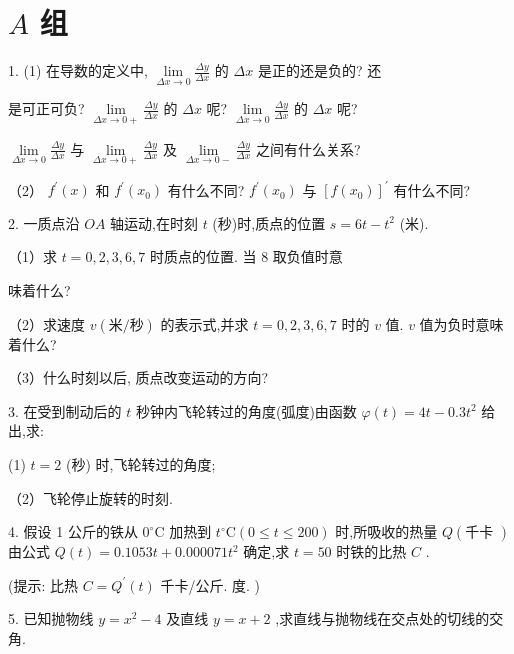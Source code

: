 \documentclass[lang=cn,newtx,12pt,scheme=chinese]{elegantbook}
\begin{document}
\section*{\(A\) 组}

1. (1) 在导数的定义中, \(\mathop{\lim }\limits_{{{\Delta x} \rightarrow 0}}\frac{\Delta y}{\Delta x}\) 的 \({\Delta x}\) 是正的还是负的? 还

是可正可负? \(\mathop{\lim }\limits_{{{\Delta x} \rightarrow 0 + }}\frac{\Delta y}{\Delta x}\) 的 \({\Delta x}\) 呢? \(\mathop{\lim }\limits_{{{\Delta x} \rightarrow 0}}\frac{\Delta y}{\Delta x}\) 的 \({\Delta x}\) 呢?

\(\mathop{\lim }\limits_{{{\Delta x} \rightarrow 0}}\frac{\Delta y}{\Delta x}\) 与 \(\mathop{\lim }\limits_{{{\Delta x} \rightarrow 0 + }}\frac{\Delta y}{\Delta x}\) 及 \(\mathop{\lim }\limits_{{{\Delta x} \rightarrow 0 - }}\frac{\Delta y}{\Delta x}\) 之间有什么关系?

（2） \({f}^{\prime }\left( x\right)\) 和 \({f}^{\prime }\left( {x}_{0}\right)\) 有什么不同? \({f}^{\prime }\left( {x}_{0}\right)\) 与 \({\left\lbrack f\left( {x}_{0}\right) \right\rbrack }^{\prime }\) 有什么不同?

2. 一质点沿 \({OA}\) 轴运动,在时刻 \(t\) (秒)时,质点的位置 \(s = {6t} - {t}^{2}\) (米).

（1）求 \(t = 0,2,3,6,7\) 时质点的位置. 当 8 取负值时意

味着什么?

（2）求速度 \(v\left( {\text{米}/\text{秒}}\right)\) 的表示式,并求 \(t = 0,2,3,6,7\) 时的 \(v\) 值. \(v\) 值为负时意味着什么?

（3）什么时刻以后, 质点改变运动的方向?

3. 在受到制动后的 \(t\) 秒钟内飞轮转过的角度(弧度)由函数 \(\varphi \left( t\right) = {4t} - {0.3}{t}^{2}\) 给出,求:

(1) \(t = 2\) (秒) 时,飞轮转过的角度;

（2）飞轮停止旋转的时刻.

4. 假设 1 公斤的铁从 \({0}^{ \circ }\mathrm{C}\) 加热到 \({t}^{ \circ }\mathrm{C}\left( {0 \leq t \leq {200}}\right)\) 时,所吸收的热量 \(Q\left( \text{千卡 }\right)\) 由公式 \(Q\left( t\right) = {0.1053t} + {0.000071}{t}^{2}\) 确定,求 \(t = {50}\) 时铁的比热 \(C\) .

(提示: 比热 \(C = {Q}^{\prime }\left( t\right)\) 千卡/公斤. 度. )

5. 已知抛物线 \(y = {x}^{2} - 4\) 及直线 \(y = x + 2\) ,求直线与抛物线在交点处的切线的交角.
\end{document}
